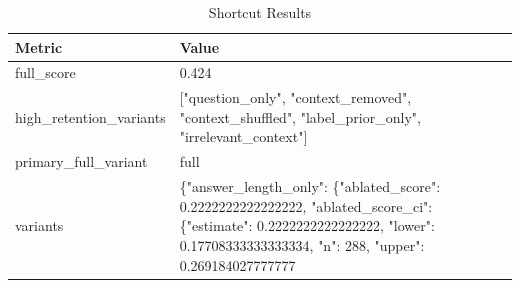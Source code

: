 \begin{table}[t]
\centering
\caption{Shortcut Results}
\begin{tabular}{ll}
\toprule
Metric & Value \\
\midrule
full\_score & 0.424 \\
high\_retention\_variants & ["question\_only", "context\_removed", "context\_shuffled", "label\_prior\_only", "irrelevant\_context"] \\
primary\_full\_variant & full \\
variants & \{"answer\_length\_only": \{"ablated\_score": 0.2222222222222222, "ablated\_score\_ci": \{"estimate": 0.2222222222222222, "lower": 0.17708333333333334, "n": 288, "upper": 0.269184027777777 \\
\bottomrule
\end{tabular}
\end{table}
